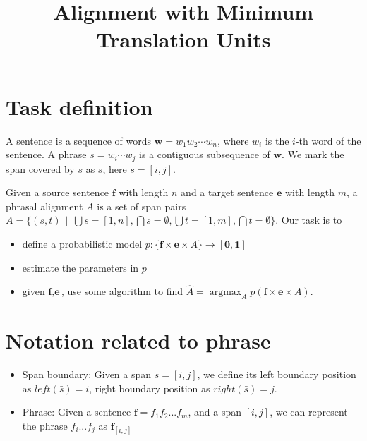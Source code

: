 \documentclass[11pt, letterpaper]{article}   	%
\title{Alignment with Minimum Translation Units}
\begin{document}
\maketitle
\section{Task definition}
A sentence is a sequence of words $\textbf{w}=w_1 w_2 \cdots w_n $, where $w_i$ is the $i$-th word of the sentence. A phrase $s=w_i \cdots w_j $ is a contiguous subsequence of $\textbf{w}$. 
We mark the span covered by $s$ as $\bar{s}$, here $\bar{s}=[i,j]$.

Given a source sentence $\mathbf{f}$ with length $n$ and a target sentence $\mathbf{e}$ with length $m$, a phrasal alignment $A$ is a set of span pairs $A=\{(s,t) \, \mid \, \bigcup {s} = [1,n], \bigcap {s} = \emptyset,  \bigcup {t} = [1,m], \bigcap {t} = \emptyset \}$. Our task is to 
\begin{itemize} 
\item define a probabilistic model $p: \{\textbf{f} \times \textbf{e} \times A\} \rightarrow \mathbf{[0,1]}$
\item estimate the parameters in $p$
\item given $\textbf{f},\textbf{e}$, use some algorithm to find $\hat{A}=\operatorname*{argmax}_{A} p(\textbf{f} \times \textbf{e} \times A)$.
\end{itemize}
 
\section{Notation related to phrase}

\begin{itemize}
\item Span boundary: Given a span $\bar{s}=[i,j]$, we define its left boundary position as $\mathit{left}(\bar{s})=i$, right boundary position as $\mathit{right}(\bar{s})=j$. 

\item Phrase: Given a sentence $\textbf{f}=f_1 f_2 ... f_m$, and a span $[i,j]$, we can represent the phrase $f_i ... f_j$ as $\textbf{f}_{[i,j]}$
\end{itemize}
\end{document}
